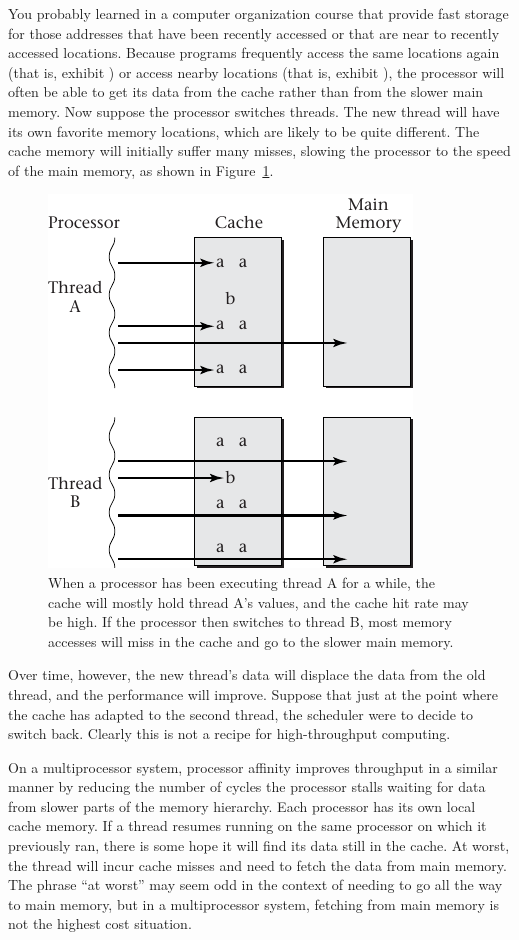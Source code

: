 You probably learned in a computer organization course that
 provide fast storage for those addresses that have been
recently accessed or that are near to recently accessed locations.
Because programs frequently access the same locations again (that is,
exhibit ) or access nearby locations
(that is, exhibit
), the processor will often be able to get its data
from the cache rather than from the slower main memory.  Now
suppose the processor switches threads.  The new thread will have its own favorite
memory locations, which are likely to be quite different.  The cache
memory will initially suffer many misses, slowing the processor to the
speed of the main memory, as shown in Figure~\ref{scan-3-2}.
\begin{figure}
\centerline{\includegraphics{hail_f0304}}
\caption{When a processor has been executing thread A for a while, the
  cache will mostly hold thread A's values, and the cache hit rate may
  be high.  If the processor then
  switches to thread B, most memory accesses will miss in the cache
  and go to the slower main memory.}
\label{scan-3-2}
\end{figure}
Over time, however, the new thread's data
will displace the data from the old thread, and the performance will
improve.  Suppose that just at the point where the cache has adapted to
the second thread, the scheduler were to decide to
switch back.  Clearly this is not a recipe for high-throughput
computing.

On a multiprocessor system, processor affinity improves throughput in
a similar manner by reducing the number of cycles the processor
stalls waiting for data from slower parts of the memory hierarchy.
Each processor has its own local cache
memory.  If a thread resumes running on the same processor on which it
previously ran, there is some hope it will find its data still in
the cache.  At worst, the thread will incur cache misses and need to
fetch the data from main memory.  The phrase ``at worst'' may seem odd
in the context of needing to go all the way to main memory, but in a
multiprocessor system, fetching from main memory is not the highest
cost situation.

